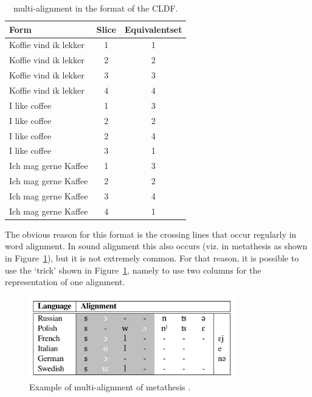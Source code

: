 \documentclass[11pt]{article}
\begin{document}
\begin{table}[htbp]
\centering
\begin{tabular}{ l c c }            \hline
 Form & Slice & Equivalentset    \\ \hline
 Koffie vind ik lekker & 1 & 1   \\
 Koffie vind ik lekker & 2 & 2   \\
 Koffie vind ik lekker & 3 & 3   \\
 Koffie vind ik lekker & 4 & 4   \\ \hline
 I like coffee         & 1 & 3   \\
 I like coffee         & 2 & 2   \\
 I like coffee         & 2 & 4   \\
 I like coffee         & 3 & 1   \\ \hline
 Ich mag gerne Kaffee  & 1 & 3   \\
 Ich mag gerne Kaffee  & 2 & 2   \\
 Ich mag gerne Kaffee  & 3 & 4   \\
 Ich mag gerne Kaffee  & 4 & 1   \\ \hline
\end{tabular}
\caption{multi-alignment in the format of the CLDF.}
\label{tab:cldf_paralleltext}
\end{table}

The obvious reason for this format is the crossing lines that occur regularly in word alignment. In sound alignment this also occurs (viz. in metathesis as shown in Figure~\ref{fig:metathesis_list}), but it is not extremely common. For that reason, it is possible to use the `trick' shown in Figure~\ref{fig:metathesis_list}, namely to use two columns for the representation of one alignment.

\begin{figure}[htbp]
  \centering
  \includegraphics[width=0.8\textwidth]{images/metathesis_list.pdf}
  \caption{Example of multi-alignment of metathesis \parencite[135]{list2014}.}
  \label{fig:metathesis_list}
\end{figure}
\end{document}
